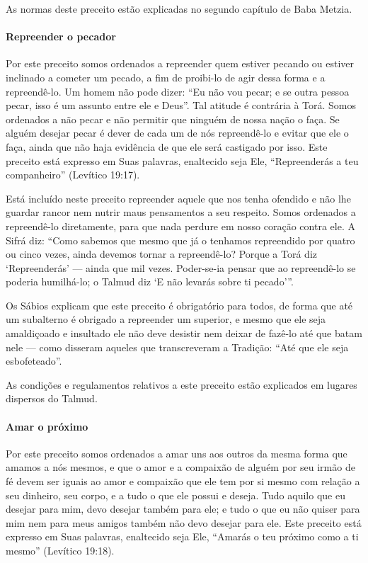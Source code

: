 As normas deste preceito estão explicadas no segundo capítulo de Baba
Metzia.

\paragraph{Repreender o pecador}

Por este preceito somos ordenados a repreender quem estiver pecando ou
estiver inclinado a cometer um pecado, a fim de proibi-lo de agir dessa
forma e a repreendê-lo. Um homem não pode dizer: ``Eu não vou pecar; e
se outra pessoa pecar, isso é um assunto entre ele e Deus''. Tal atitude
é contrária à Torá. Somos ordenados a não pecar e não permitir que
ninguém de nossa nação o faça. Se alguém desejar pecar é dever de cada
um de nós repreendê-lo e evitar que ele o faça, ainda que não haja
evidência de que ele será castigado por isso. Este preceito está
expresso em Suas palavras, enaltecido seja Ele, ``Repreenderás a teu
companheiro'' (Levítico 19:17).

Está incluído neste preceito repreender aquele que nos tenha ofendido e
não lhe guardar rancor nem nutrir maus pensamentos a seu respeito. Somos
ordenados a repreendê-lo diretamente, para que nada perdure em nosso
coração contra ele. A Sifrá diz: ``Como sabemos que mesmo que já o
tenhamos repreendido por quatro ou cinco vezes, ainda devemos tornar a
repreendê-lo? Porque a Torá diz `Repreenderás' --- ainda que mil vezes.
Poder-se-ia pensar que ao repreendê-lo se poderia humilhá-lo; o Talmud
diz `E não levarás sobre ti pecado'''.

Os Sábios explicam que este preceito é obrigatório para todos, de forma
que até um subalterno é obrigado a repreender um superior, e mesmo que
ele seja amaldiçoado e insultado ele não deve desistir nem deixar de
fazê-lo até que batam nele --- como disseram aqueles que transcreveram a
Tradição: ``Até que ele seja esbofeteado''.

As condições e regulamentos relativos a este preceito estão explicados
em lugares dispersos do Talmud.

\paragraph{Amar o próximo}

Por este preceito somos ordenados a amar uns aos outros da mesma forma
que amamos a nós mesmos, e que o amor e a compaixão de alguém por seu
irmão de fé devem ser iguais ao amor e compaixão que ele tem por si
mesmo com relação a seu dinheiro, seu corpo, e a tudo o que ele possui e
deseja. Tudo aquilo que eu desejar para mim, devo desejar também para
ele; e tudo o que eu não quiser para mim nem para meus amigos também não
devo desejar para ele. Este preceito está expresso em Suas palavras,
enaltecido seja Ele, ``Amarás o teu próximo como a ti mesmo'' (Levítico
19:18).

